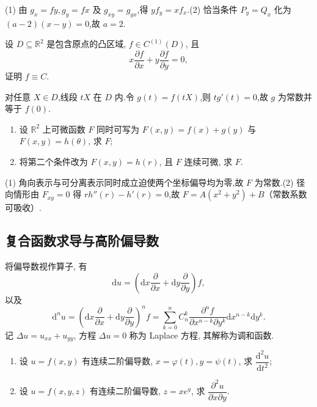 \begin{solution}
    (1) 由 $g_x=fy,g_y=fx$ 及 $g_{xy}=g_{yx}$,得 $y f_y=x f_x$.(2) 恰当条件 $P_y=Q_x$ 化为 $(a-2)(x-y)=0$,故 $a=2$.
\end{solution}

\begin{example}
    设 $D\subseteq\mathbb{R}^2$ 是包含原点的凸区域, $f\in C^{(1)}(D)$, 且
    \[
        x\dfrac{\partial f}{\partial x}+y\dfrac{\partial f}{\partial y}=0,
    \]
    证明 $f\equiv C$.
\end{example}
\exampleblank

\begin{solution}
    对任意 $X\in D$,线段 $tX$ 在 $D$ 内.令 $g(t)=f(tX)$,则 $tg'(t)=0$,故 $g$ 为常数并等于 $f(0)$.
\end{solution}

\begin{example}
    \begin{enumerate}
        \item 设 $\mathbb{R}^2$ 上可微函数 $F$ 同时可写为 $F(x,y)=f(x)+g(y)$ 与 $F(x,y)=h(\theta)$, 求 $F$;
        \item 将第二个条件改为 $F(x,y)=h(r)$, 且 $F$ 连续可微, 求 $F$.
    \end{enumerate}
\end{example}
\exampleblank

\begin{solution}
    (1) 角向表示与可分离表示同时成立迫使两个坐标偏导均为零,故 $F$ 为常数.(2) 径向情形由 $F_{xy}=0$ 得 $rh''(r)-h'(r)=0$,故 $F=A(x^2+y^2)+B$（常数系数可吸收）.
\end{solution}



\subsection{复合函数求导与高阶偏导数}

将偏导数视作算子, 有
\[
    \mathrm{d}u=\left(\mathrm{d}x\dfrac{\partial}{\partial x}+\mathrm{d}y\dfrac{\partial}{\partial y}\right)f,
\]
以及
\[
    \mathrm{d}^nu
    =\left(\mathrm{d}x\dfrac{\partial}{\partial x}+\mathrm{d}y\dfrac{\partial}{\partial y}\right)^nf
    =\sum\limits_{k=0}^nC_n^k
    \dfrac{\partial^nf}{\partial x^{n-k}\partial y^k}
    \mathrm{d}x^{n-k}\mathrm{d}y^k.
\]
记 $\Delta u=u_{xx}+u_{yy}$, 方程 $\Delta u=0$ 称为 Laplace 方程, 其解称为调和函数.

\begin{example}
    \begin{enumerate}
        \item 设 $u=f(x,y)$ 有连续二阶偏导数, $x=\varphi(t),y=\psi(t)$, 求 $\dfrac{\mathrm{d}^2u}{\mathrm{d}t^2}$;
        \item 设 $u=f(x,y,z)$ 有连续二阶偏导数, $z=xe^y$, 求 $\dfrac{\partial^2u}{\partial x\partial y}$.
    \end{enumerate}
\end{example}
\exampleblank

